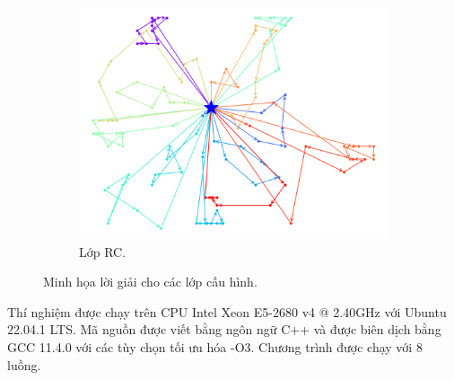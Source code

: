 \begin{figure}[H]
\begin{subfigure}{.3\textwidth}
		\includegraphics[width=1\linewidth]{figures/routes_rc101.png}
		\caption{Lớp RC.}
		\label{fig:route_rc}
	\end{subfigure}
	\caption{Minh họa lời giải cho các lớp cấu hình.}
\end{figure}

Thí nghiệm được chạy trên CPU Intel Xeon E5-2680 v4 @ 2.40GHz với Ubuntu 22.04.1 LTS. Mã nguồn được viết bằng ngôn ngữ C++ và được biên dịch bằng GCC 11.4.0 với các tùy chọn tối ưu hóa -O3. Chương trình được chạy với 8 luồng.




